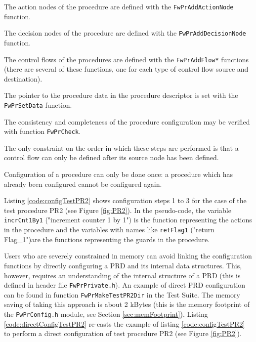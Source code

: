 \documentclass[a4paper,10pt]{article}
\newenvironment{fw_enumerate}					%
{\begin{enumerate}
  \setlength{\itemsep}{1mm}
  \setlength{\parskip}{0pt}
  \setlength{\parsep}{0pt}}
{\end{enumerate}}
\begin{document}
\begin{fw_enumerate}
\item The action nodes of the procedure are defined with the \texttt{FwPrAddAction\-Node} function.  
\item The decision nodes of the procedure are defined with the \texttt{FwPrAdd\-Deci\-sion\-Node} function.
\item The control flows of the procedures are defined with the \texttt{FwPrAddFlow*} functions (there are several of these functions, 
one for each type of control flow source and destination).
\item The pointer to the procedure data in the procedure descriptor is set with the \texttt{FwPrSetData} function.
\item The consistency and completeness of the procedure configuration may be verified with function \texttt{FwPrCheck}. 
\end{fw_enumerate}

The only constraint on the order in which these steps are performed is that a control flow 
can only be defined after its source node has been defined. 

Configuration of a procedure can only be done once: a procedure which has already been configured 
cannot be configured again.

Listing \ref{code:configTestPR2} shows configuration steps 1 to 3 for the case of the test procedure PR2 
(see Figure \ref{fig:PR2}). In the pseudo-code, the variable \texttt{incrCnt1By1} ("increment 
counter 1 by 1") is the function representing the actions in the procedure and the variables with names 
like \texttt{retFlag1} ("return Flag\_1")are the functions representing the guards in the procedure.

Users who are severely constrained in memory can avoid linking the configuration functions by directly 
configuring a PRD and its internal data structures. This, however, requires an understanding of the internal 
structure of a PRD (this is defined in header file \texttt{FwPrPrivate.h}). An example of direct PRD 
configuration can be found in function \texttt{FwPrMakeTestPR2Dir} in the Test Suite. The memory saving of 
taking this approach is about 2 kBytes (this is the memory footprint of the \texttt{FwPrConfig.h} module, 
see Section \ref{sec:memFootprint}). 
Listing \ref{code:directConfigTestPR2} re-casts the example of listing \ref{code:configTestPR2}
to perform a direct configuration of test procedure PR2 (see Figure \ref{fig:PR2}). 
\end{document}
